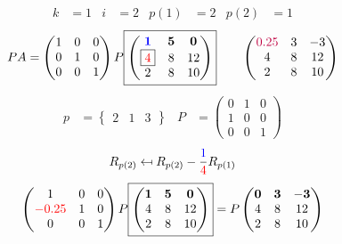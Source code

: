 \documentclass[pdf]{beamer}
\begin{document}
\begin{frame}{}\begin{align*} k &= 1 & i &= 2 & p(1) &= 2 & p(2) &= 1\end{align*} $$PA=\begin{pmatrix}1&0&0\\0&1&0\\0&0&1\end{pmatrix} P \boxed{\begin{pmatrix}\mathbf{{\color{blue}1}}&\mathbf{5}&\mathbf{0}\\\boxed{{\color{red}4}}&8&12\\2&8&10\end{pmatrix}} \quad\quad \begin{pmatrix}{\color{purple}0.25}&3&-3\\4&8&12\\2&8&10\end{pmatrix}$$ \begin{align*} p&= \begin{Bmatrix}2&1&3\end{Bmatrix} & P&= \begin{pmatrix}0&1&0\\1&0&0\\0&0&1\end{pmatrix} \end{align*} $$R_{p(2)} \mapsfrom R_{p(2)} - \frac{{\color{blue}1}}{{\color{red}4}} R_{p(1)}$$ $$ \begin{pmatrix}1&0&0\\{\color{red}-0.25}&1&0\\0&0&1\end{pmatrix} P \boxed{\begin{pmatrix}\mathbf{1}&\mathbf{5}&\mathbf{0}\\4&8&12\\2&8&10\end{pmatrix}} = P \begin{pmatrix}\mathbf{0}&\mathbf{3}&\mathbf{-3}\\4&8&12\\2&8&10\end{pmatrix} $$\end{frame}
\end{document}
